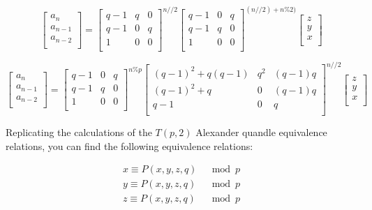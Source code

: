 \documentclass[paper.tex]{subfiles}
\begin{document}
\[
\left[ \begin{array}{ccc}
a_{n} \\
a_{n-1} \\
a_{n-2} \\
\end{array} \right]
=
\left[ \begin{array}{ccc}
q-1 & q & 0 \\
q-1 & 0 & q \\
1 & 0 & 0 \\
\end{array} \right] ^{n//2}
\left[ \begin{array}{ccc}
q-1 & 0 & q \\
q-1 & q & 0 \\
1 & 0 & 0 \\
\end{array} \right] ^{(n//2) + n\%2)}
\left[ \begin{array}{ccc}
z \\
y \\
x \\
\end{array} \right]
\]

\[
\left[ \begin{array}{ccc}
a_{n} \\
a_{n-1} \\
a_{n-2} \\
\end{array} \right]
=
\left[ \begin{array}{ccc}
q-1 & 0 & q \\
q-1 & q & 0 \\
1 & 0 & 0 \\
\end{array} \right] ^{n\%p}
\left[ \begin{array}{ccc}
(q-1)^{2} + q(q-1) & q^{2} & (q-1)q \\
(q-1)^{2} + q & 0 & (q-1)q \\
q-1 & 0 & q \\
\end{array} \right] ^{n//2}
\left[ \begin{array}{ccc}
z \\
y \\
x \\
\end{array} \right]
\]

Replicating the calculations of the $T(p,2)$ Alexander quandle equivalence relations, you can find the following equivalence relations:

\begin{align*}
	x \equiv P(x,y,z,q) & \mod{p} \\
	y \equiv P(x,y,z,q) & \mod{p} \\
	z \equiv P(x,y,z,q) & \mod{p} \\
\end{align*}
\end{document}
